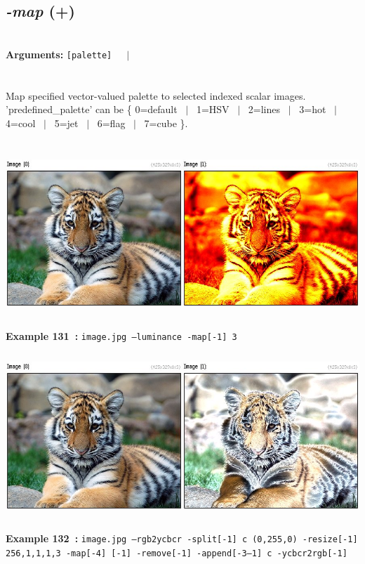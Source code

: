 \documentclass[a4paper,11pt,twoside]{book}
\begin{document}
\subsection{\emph{-map} (+)}\vspace*{-0.5em}
~\\\textbf{Arguments: } 
{\small \texttt{[palette]}}~~~$|$\\
\\~\\
Map specified vector-valued palette to selected indexed scalar images.
~\\'predefined\_palette' can be \{ 0=default ~$|$~ 1=HSV ~$|$~ 2=lines ~$|$~ 3=hot ~$|$~ 4=cool ~$|$~ 5=jet ~$|$~ 6=flag ~$|$~ 7=cube \}.
\begin{center}\includegraphics[keepaspectratio=true,height=7cm,width=\textwidth]{img/gmic_def131.jpg}\\
{\footnotesize \textbf{Example 131~:} \texttt{image.jpg --luminance -map[-1] 3}}
\\\includegraphics[keepaspectratio=true,height=7cm,width=\textwidth]{img/gmic_def132.jpg}\\
{\footnotesize \textbf{Example 132~:} \texttt{image.jpg --rgb2ycbcr -split[-1] c (0,255,0) -resize[-1] 256,1,1,1,3 -map[-4] [-1] -remove[-1] -append[-3--1] c -ycbcr2rgb[-1]}}
\end{center}
\end{document}
